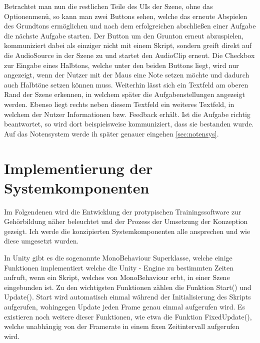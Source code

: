 Betrachtet man nun die restlichen Teile des UIs der Szene, ohne das Optionenmenü, so kann man zwei Buttons sehen, welche das erneute Abspielen des Grundtons ermöglichen und nach dem erfolgreichen abschließen einer Aufgabe die nächste Aufgabe starten. Der Button um den Grunton erneut abzuspielen, kommuniziert dabei als einziger nicht mit einem Skript, sondern greift direkt auf die AudioSource in der Szene zu und startet den AudioClip erneut. Die Checkbox zur Eingabe eines Halbtons, welche unter den beiden Buttons liegt, wird nur angezeigt, wenn der Nutzer mit der Maus eine Note setzen möchte und dadurch auch Halbtöne setzen können muss. Weiterhin lässt sich ein Textfeld am oberen Rand der Szene erkennen, in welchem später die Aufgabenstellungen angezeigt werden. Ebenso liegt rechts neben diesem Textfeld ein weiteres Textfeld, in welchem der Nutzer Informationen bzw. Feedback erhält. Ist die Aufgabe richtig beantwortet, so wird dort beispielsweise kommuniziert, dass sie bestanden wurde. Auf das Notensystem werde ih später genauer eingehen \ref{sec:notensys}. 

\section{Implementierung der Systemkomponenten}
Im Folgendenen wird die Entwicklung der protypischen Trainingssoftware zur Gehörbildung näher beleuchtet und der Prozess der Umsetzung der Konzeption gezeigt. Ich werde die konzipierten Systemkomponenten alle ansprechen und wie diese umgesetzt wurden. 

In Unity gibt es die sogenannte MonoBehaviour Superklasse, welche einige Funktionen implementiert welche die Unity - Engine zu bestimmten Zeiten aufruft, wenn ein Skript, welches von MonoBehaviour erbt, in einer Szene eingebunden ist. Zu den wichtigsten Funktionen zählen die Funktion Start() und Update(). Start wird automatisch einmal während der Initialisierung des Skripts aufgerufen, wohingegen Update jeden Frame genau einmal aufgerufen wird. Es existieren noch weitere dieser Funktionen, wie etwa die Funktion FixedUpdate(), welche unabhängig von der Framerate in einem fixen Zeitintervall aufgerufen wird.

